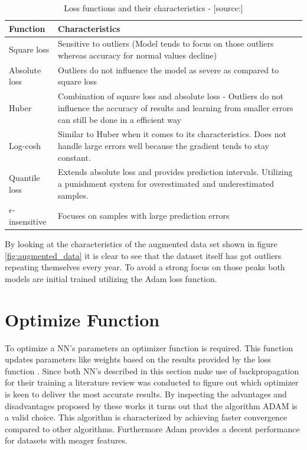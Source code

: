 \begin{table}[htbp]
	\centering
		\begin{tabularx}{\textwidth}{|l|X|}
		\hline
		\rowcolor[gray]{0.9}
		Function & Characteristics \\
		\hline
		Square loss &Sensitive to outliers (Model tends to focus on those outliers whereas accuracy for normal values decline)\\
		 \hline
		Absolute loss & Outliers do not influence the model as severe as compared to square loss  \\
		Huber & Combination of square loss and absolute loss - Outliers do not influence the accuracy of results and learning from smaller errors can still be done in a efficient way  \\
		\hline
		Log-cosh & Similar to Huber when it comes to its characteristics. Does not handle large errors well because the gradient tends to stay constant. \\
		\hline
		Quantile loss & Extends absolute loss and provides prediction intervals. Utilizing a punishment system for overestimated and underestimated samples. \\
		\hline
		$\epsilon$-insensitive & Focuses on samples with large prediction errors \\
		\hline	
		\end{tabularx}
	\label{tab:loss_function}
	\caption{Loss functions and their characteristics - [source:\cite{loss_func}]}
\end{table}

By looking at the characteristics of the augmented data set shown in figure \ref{fig:augmented_data} it is clear to see that the dataset itself has got outliers repeating themselves every year. To avoid a strong focus on those peaks both models are initial trained utilizing the Adam loss function.

\section{Optimize Function}
\label{sec:optimize_func}
To optimize a NN's parameters an optimizer function is required. This function updates parameters like weights based on the results provided by the loss function \cite{optimizer}. Since both NN's described in this section make use of backpropagation for their training a literature review was conducted to figure out which optimizer is keen to deliver the most accurate results. By inspecting the advantages and disadvantages proposed by these works \cite{optimizer}\cite{optimizer_1}\cite{optimizer_2} it turns out that the algorithm ADAM is a valid choice. This algorithm is characterized by achieving faster convergence compared to other algorithms. Furthermore Adam provides a decent performance for datasets with meager features.

